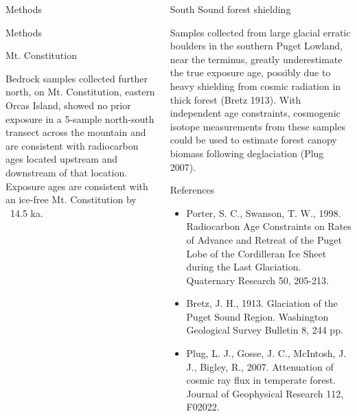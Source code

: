 \documentclass{beamer}
\begin{document}
\begin{frame}{}
\begin{columns}[T]
\begin{column}{.32\columnwidth}
\begin{block}{Methods}

Methods
	
\end{block}

	
\begin{block}{Mt. Constitution}
	
Bedrock samples collected further north, on Mt. Constitution, eastern Orcas Island, showed no prior exposure in a 5-sample north-south transect across the mountain and are consistent with radiocarbon ages located upstream and downstream of that location.
Exposure ages are consistent with an ice-free Mt. Constitution by ~14.5 ka. 

\end{block}

\end{column}

\begin{column}{.32\columnwidth}

\begin{block}{South Sound forest shielding}

Samples collected from large glacial erratic boulders in the southern Puget Lowland, near the terminus, greatly underestimate the true exposure age, possibly due to heavy shielding from cosmic radiation in thick forest (Bretz 1913).
With independent age constraints, cosmogenic isotope measurements from these samples could be used to estimate forest canopy biomass following deglaciation (Plug 2007).

\end{block}

\begin{block}{References} 
{\small

\begin{itemize}

\item Porter, S. C., Swanson, T. W., 1998. Radiocarbon Age Constraints on Rates of Advance and Retreat of the Puget Lobe of the Cordilleran Ice Sheet during the Last Glaciation. Quaternary Research 50, 205-213.

\item Bretz, J. H., 1913. Glaciation of the Puget Sound Region. Washington Geological Survey Bulletin 8, 244 pp.

\item Plug, L. J., Gosse, J. C., McIntosh, J. J., Bigley, R., 2007. Attenuation of cosmic ray flux in temperate forest. Journal of Geophysical Research 112, F02022.


\end{itemize}}
\end{block}
\end{column}
\end{columns}
\end{frame}
\end{document}

